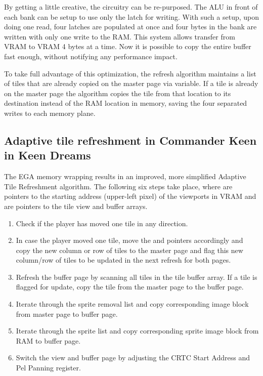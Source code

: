 \documentclass[book.tex]{subfiles}
\begin{document}
\par
By getting a little creative, the circuitry can be re-purposed. The ALU in front of each bank can be setup to use only the latch for writing. With such a setup, upon doing one read, four latches are populated at once and four bytes in the bank are written with only one write to the RAM. This system allows transfer from VRAM to VRAM 4 bytes at a time. Now it is possible to copy the entire buffer fast enough, without notifying any performance impact.\\
\par
\begin{minipage}{\textwidth}
  
  \end{minipage}
  \label{ega_latch_copy}
  \par

To take full advantage of this optimization, the refresh algorithm maintains a list of tiles that are already copied on the master page via  variable. If a tile is already on the master page the algorithm copies the tile from that location to its destination instead of the RAM location in memory, saving the four separated writes to each memory plane.\\



\pagebreak

\subsection{Adaptive tile refreshment in Commander Keen in Keen Dreams} \label{section:scroll_refresh_dreams}

The EGA memory wrapping results in an improved, more simplified Adaptive Tile Refreshment algorithm. The following six steps take place, where  are pointers to the starting address (upper-left pixel) of the viewports in VRAM and  are pointers to the tile view and buffer arrays.
\begin{enumerate}
\item Check if the player has moved one tile in any direction.
\item In case the player moved one tile, move the  and  pointers accordingly and copy the new column or row of tiles to the master page and flag this new column/row of tiles to be updated in the next refresh for both pages. 
\item Refresh the buffer page by scanning all tiles in the tile buffer array. If a tile is flagged for update, copy the tile from the master page to the buffer page.
\item Iterate through the sprite removal list and copy corresponding image block from master page to buffer page. 
\item Iterate through the sprite list and copy corresponding sprite image block from RAM to buffer page.
\item Switch the view and buffer page by adjusting the CRTC Start Address and Pel Panning register.
\end{enumerate}
\end{document}
